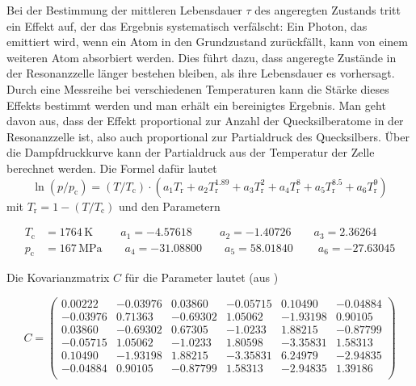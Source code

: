Bei der Bestimmung der mittleren Lebensdauer $\tau$ des angeregten Zustands tritt ein Effekt auf,
der das Ergebnis systematisch verfälscht:
Ein Photon, das emittiert wird, wenn ein Atom in den Grundzustand zurückfällt,
kann von einem weiteren Atom absorbiert werden.
Dies führt dazu, dass angeregte Zustände in der Resonanzzelle länger bestehen bleiben,
als ihre Lebensdauer es vorhersagt.
Durch eine Messreihe bei verschiedenen Temperaturen kann die Stärke dieses Effekts bestimmt werden und
man erhält ein bereinigtes Ergebnis.
Man geht davon aus, dass der Effekt proportional zur Anzahl der Quecksilberatome in der Resonanzzelle ist,
also auch proportional zur Partialdruck des Quecksilbers.
Über die Dampfdruckkurve kann der Partialdruck aus der Temperatur der Zelle berechnet werden.
Die Formel dafür lautet
\begin{equation}
\label{eq:vaporpress}
\ln(p/p_{\text{c}})= (T/T_{\text{c}}) \cdot (a_1T_{\text{r}}^{}+a_2T_{\text{r}}^{1.89}+a_3T_{\text{r}}^{2}
+a_4T_{\text{r}}^{8}+a_5T_{\text{r}}^{8.5}+a_6T_{\text{r}}^{9})
\end{equation}
mit $T_{\text{r}}=1-(T/T_{\text{c}})$ und den Parametern



\begin{equation}
\label{eq:params}
\begin{split}
T_{\text{c}} &= 1764\,\text{K} \ \: \qquad a_1=-4.57618  \ \: \qquad a_2=-1.40726        \qquad a_3=2.36264\\
p_{\text{c}} &= 167\,\text{MPa}     \qquad a_4=-31.08800      \qquad a_5=58.01840  \  \qquad a_6=-27.63045
\end{split}
\end{equation}

Die Kovarianzmatrix $C$ für die Parameter lautet (aus \cite{manual})

\begin{equation}
\label{eq:cov}
C=
\left(
\begin{array}{cccccc}
 0.00222 & -0.03976 & 0.03860 & -0.05715 & 0.10490 & -0.04884 \\
 -0.03976 & 0.71363 & -0.69302 & 1.05062 & -1.93198 & 0.90105 \\
 0.03860 & -0.69302 & 0.67305 & -1.0233 & 1.88215 & -0.87799 \\
 -0.05715 & 1.05062 & -1.0233 & 1.80598 & -3.35831 & 1.58313 \\
 0.10490 & -1.93198 & 1.88215 & -3.35831 & 6.24979 & -2.94835 \\
 -0.04884 & 0.90105 & -0.87799 & 1.58313 & -2.94835 & 1.39186 \\
\end{array}
\right)
\end{equation}